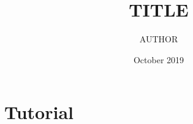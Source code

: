 \documentclass{article}
\title{TITLE}
\author{AUTHOR}
\date{October 2019}
\begin{document}





\section{Tutorial}























\end{document}

